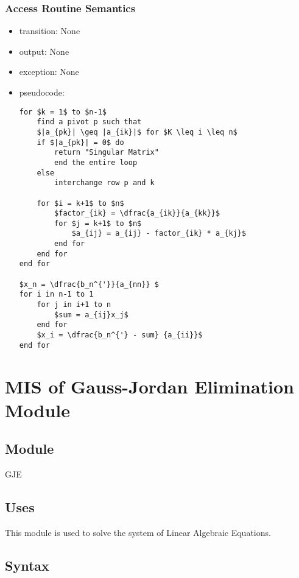 \documentclass[12pt, titlepage]{article}
\begin{document}
\subsubsection{Access Routine Semantics}

\noindent %
\begin{itemize}
\item transition: None%
\item output: None%
\item exception: None%
\item pseudocode:
\begin{lstlisting}[mathescape=true]
for $k = 1$ to $n-1$
    find a pivot p such that
    $|a_{pk}| \geq |a_{ik}|$ for $K \leq i \leq n$
    if $|a_{pk}| = 0$ do
        return "Singular Matrix"
        end the entire loop
    else 
        interchange row p and k
        
    for $i = k+1$ to $n$
        $factor_{ik} = \dfrac{a_{ik}}{a_{kk}}$
        for $j = k+1$ to $n$
            $a_{ij} = a_{ij} - factor_{ik} * a_{kj}$
        end for
    end for
end for

$x_n = \dfrac{b_n^{'}}{a_{nn}} $
for i in n-1 to 1
    for j in i+1 to n
        $sum = a_{ij}x_j$
    end for
    $x_i = \dfrac{b_n^{'} - sum} {a_{ii}}$
end for
\end{lstlisting}
\end{itemize}

\section{MIS of {Gauss-Jordan Elimination  Module}} \label{modgje}

\subsection{Module}

GJE


\subsection{Uses}
This module is used to solve the system of Linear Algebraic Equations.


\subsection{Syntax}
\end{document}

